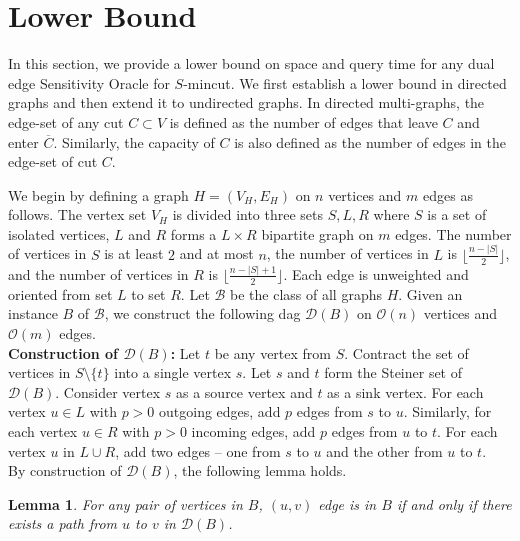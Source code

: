 \documentclass[letterpaper,11pt]{article}
\newtheorem{lemma}{Lemma}[]
\begin{document}
\section{Lower Bound} \label{sec : lower bound oracle}



In this section, we provide a lower bound on space and query time for any dual edge Sensitivity Oracle for $S$-mincut. We first establish a lower bound in directed graphs and then extend it to undirected graphs. In directed multi-graphs, the edge-set of any cut $C\subset V$ is defined as the number of edges that leave $C$ and enter $\overline{C}$. Similarly, the capacity of $C$ is also defined as the number of edges in the edge-set of cut $C$.

We begin by defining a graph $H=(V_H,E_H)$ on $n$ vertices and $m$ edges as follows. The vertex set $V_H$ is divided into three sets $S,L,R$ where $S$ is a set of isolated vertices, $L$ and $R$ forms a $L\times R$ bipartite graph on $m$ edges. The number of vertices in $S$ is at least $2$ and at most $n$, the number of vertices in $L$ is $\lfloor \frac{n-|S|}{2} \rfloor$, and the number of vertices in $R$ is $\lfloor\frac{n-|S|+1}{2}\rfloor$. Each edge is unweighted and oriented from set $L$ to set $R$. Let ${\mathcal B}$ be the class of all graphs $H$. Given an instance $B$ of ${\mathcal B}$, we construct the following dag ${\mathcal D}(B)$ on ${\mathcal O}(n)$ vertices and ${\mathcal O}(m)$ edges. \\

\noindent
\textbf{Construction of ${\mathcal D}(B)$:} Let $t$ be any vertex from $S$. Contract the set of vertices in $S\setminus \{t\}$ into a single vertex $s$. Let $s$ and $t$ form the Steiner set of ${\mathcal D}(B)$. Consider vertex $s$ as a source vertex and $t$ as a sink vertex. For each vertex $u\in L$ with $p>0$ outgoing edges, add $p$ edges from $s$ to $u$. Similarly, for each vertex $u\in R$ with $p>0$ incoming edges, add $p$ edges from $u$ to $t$. For each vertex $u$ in $L\cup R$, add two edges -- one from $s$ to $u$ and the other from $u$ to $t$.\\    

 By construction of ${\mathcal D}(B)$, the following lemma holds.
\begin{lemma} \label{lem : path exists in u,v iff u,v edge exists}
    For any pair of vertices in $B$, $(u,v)$ edge is in $B$ if and only if there exists a path from $u$ to $v$ in ${\mathcal D}(B)$.
\end{lemma}
\end{document}
